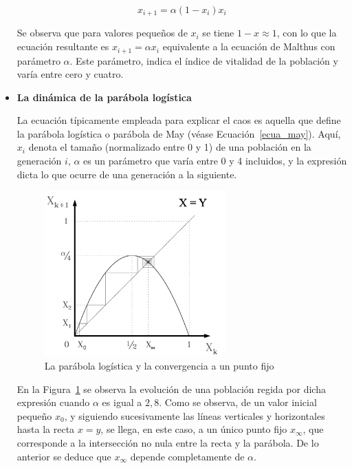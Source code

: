 \documentclass[letterpaper, 11pt, oneside]{article}
\theoremstyle{definition}
\theoremstyle{remark}
\begin{document}
\begin{itemize}
\begin{equation}
	x_{i+1} = \alpha (1-x_i ) x_i
	\label{ecua_may}
\end{equation}

Se observa que para valores pequeños de $x_i$ se tiene $1-x \approx 1$, con lo que la ecuación resultante es $x_{i+1} = \alpha x_i$ equivalente a la ecuación de Malthus con parámetro $\alpha$. Este parámetro, indica el índice de vitalidad de la población y varía entre cero y cuatro.

\newpage

\item {\bf La dinámica de la parábola logística\par} \cite{carlosPuente}
La ecuación típicamente empleada para explicar el caos es aquella que define la parábola logística o parábola de May (véase Ecuación~\ref{ecua_may}). Aquí, $x_i$ denota el tamaño (normalizado entre 0 y 1) de una población en la generación $i$, $\alpha$ es un parámetro que varía entre 0 y 4 incluidos, y la expresión dicta lo que ocurre de una generación a la siguiente. \\

\begin{figure}[ht]
	\begin{center}
		\includegraphics[width=7cm]{Imagenes/logistica_punto_fijo.png}
	\end{center}
	\caption{La parábola logística y la convergencia a un punto fijo}
	\label{logistica_punto_fijo}
\end{figure}

En la Figura~\ref{logistica_punto_fijo} se observa la evolución de una población regida por dicha expresión cuando $\alpha$ es igual a $2,8$. Como se observa, de un valor inicial pequeño $x_0$, y siguiendo sucesivamente las líneas verticales y horizontales hasta la recta $x = y$, se llega, en este caso, a un único punto fijo $x_{\infty}$, que corresponde a la intersección no nula entre la recta y la parábola. De lo anterior se deduce que $x_{\infty}$ depende completamente de $\alpha$. \\


\end{itemize}
\end{document}
